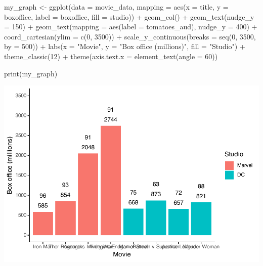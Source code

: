\documentclass[
]{krantz}
\makeatletter
\newenvironment{Shaded}{\begin{snugshade}}{\end{snugshade}}
\newcommand{\AttributeTok}[1]{\textcolor[rgb]{0.61,0.61,0.61}{#1}}
\newcommand{\DecValTok}[1]{\textcolor[rgb]{0.06,0.06,0.06}{#1}}
\newcommand{\FunctionTok}[1]{\textcolor[rgb]{0,0,0}{#1}}
\newcommand{\NormalTok}[1]{#1}
\newcommand{\OtherTok}[1]{\textcolor[rgb]{0.37,0.37,0.37}{#1}}
\newcommand{\SpecialCharTok}[1]{\textcolor[rgb]{0,0,0}{#1}}
\newcommand{\StringTok}[1]{\textcolor[rgb]{0.5,0.5,0.5}{#1}}
\newenvironment{kframe}{%
\medskip{}
\setlength{\fboxsep}{.8em}
 \def\at@end@of@kframe{}%
 \ifinner\ifhmode%
  \def\at@end@of@kframe{\end{minipage}}%
  \begin{minipage}{\columnwidth}%
 \fi\fi%
 \def\FrameCommand##1{\hskip\@totalleftmargin \hskip-\fboxsep
 \colorbox{shadecolor}{##1}\hskip-\fboxsep
     \hskip-\linewidth \hskip-\@totalleftmargin \hskip\columnwidth}%
 \MakeFramed {\advance\hsize-\width
   \@totalleftmargin\z@ \linewidth\hsize
   \@setminipage}}%
 {\par\unskip\endMakeFramed%
 \at@end@of@kframe}
\renewenvironment{Shaded}{\begin{kframe}}{\end{kframe}}
\makeatother
\begin{document}
\begin{Shaded}
\begin{Highlighting}[]
\NormalTok{my\_graph }\OtherTok{\textless{}{-}} \FunctionTok{ggplot}\NormalTok{(}\AttributeTok{data =}\NormalTok{ movie\_data,}
           \AttributeTok{mapping =} \FunctionTok{aes}\NormalTok{(}\AttributeTok{x =}\NormalTok{ title,}
                         \AttributeTok{y =}\NormalTok{ boxoffice,}
                         \AttributeTok{label =}\NormalTok{ boxoffice, }
                         \AttributeTok{fill =}\NormalTok{ studio)) }\SpecialCharTok{+}
  \FunctionTok{geom\_col}\NormalTok{() }\SpecialCharTok{+}
  \FunctionTok{geom\_text}\NormalTok{(}\AttributeTok{nudge\_y =} \DecValTok{150}\NormalTok{)  }\SpecialCharTok{+}
  \FunctionTok{geom\_text}\NormalTok{(}\AttributeTok{mapping =} \FunctionTok{aes}\NormalTok{(}\AttributeTok{label =}\NormalTok{ tomatoes\_aud), }
            \AttributeTok{nudge\_y =} \DecValTok{400}\NormalTok{) }\SpecialCharTok{+}
  \FunctionTok{coord\_cartesian}\NormalTok{(}\AttributeTok{ylim =} \FunctionTok{c}\NormalTok{(}\DecValTok{0}\NormalTok{, }\DecValTok{3500}\NormalTok{)) }\SpecialCharTok{+}
  \FunctionTok{scale\_y\_continuous}\NormalTok{(}\AttributeTok{breaks =} \FunctionTok{seq}\NormalTok{(}\DecValTok{0}\NormalTok{, }\DecValTok{3500}\NormalTok{, }\AttributeTok{by =} \DecValTok{500}\NormalTok{)) }\SpecialCharTok{+}
  \FunctionTok{labs}\NormalTok{(}\AttributeTok{x =} \StringTok{"Movie"}\NormalTok{,}
       \AttributeTok{y =} \StringTok{"Box office (millions)"}\NormalTok{,}
       \AttributeTok{fill =} \StringTok{"Studio"}\NormalTok{) }\SpecialCharTok{+}
  \FunctionTok{theme\_classic}\NormalTok{(}\DecValTok{12}\NormalTok{) }\SpecialCharTok{+}
  \FunctionTok{theme}\NormalTok{(}\AttributeTok{axis.text.x =} \FunctionTok{element\_text}\NormalTok{(}\AttributeTok{angle =} \DecValTok{60}\NormalTok{))}

\FunctionTok{print}\NormalTok{(my\_graph)}
\end{Highlighting}
\end{Shaded}

\includegraphics[width=0.65\linewidth]{bookdown_files/figure-latex/unnamed-chunk-125-1}
\end{document}
